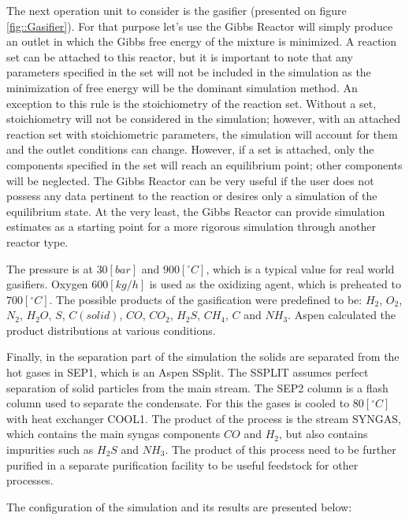 The next operation unit to consider is the gasifier (presented on figure \ref{fig::Gasifier}). For that purpose let's use the Gibbs Reactor will simply produce an outlet in which the Gibbs free energy of the mixture is minimized. A reaction set can be attached to this reactor, but it is important to note that any parameters specified in the set will not be included in the simulation as the minimization of free energy will be the dominant simulation method. An exception to this rule is the stoichiometry of the reaction set. Without a set, stoichiometry will not be considered in the simulation; however, with an attached reaction set with stoichiometric parameters, the simulation will account for them and the outlet conditions can change. However, if a set is attached, only the components specified in the set will reach an equilibrium point; other components will be neglected. The Gibbs Reactor can be very useful if the user does not possess any data pertinent to the reaction or desires only a simulation of the equilibrium state. At the very least, the Gibbs Reactor can provide simulation estimates as a starting point for a more rigorous simulation through another reactor type.

The pressure is at $30 [bar]$ and $900 [^\circ C]$, which is a typical value for real world gasifiers. Oxygen $600 [kg/h]$ is used as the oxidizing agent, which is preheated to $700 [^\circ C]$. The possible products of the gasification were predefined to be: $H_2$, $O_2$, $N_2$, $H_2O$, $S$, $C(solid)$, $CO$, $CO_2$, $H_2S$, $CH_4$, $C$ and $NH_3$. Aspen calculated the product distributions at various conditions.

Finally, in the separation part of the simulation the solids are separated from the hot gases in SEP1, which is an Aspen SSplit. The SSPLIT assumes perfect separation of solid particles from the main stream. The SEP2 column is a flash column used to separate the condensate. For this the gases is cooled to $80 [^\circ C]$ with heat exchanger COOL1. The product of the process is the stream SYNGAS, which contains the main syngas components $CO$ and $H_2$, but also contains impurities such as $H_2S$ and $NH_3$. The product of this process need to be further purified in a separate purification facility to be useful feedstock for other processes.

The configuration of the simulation and its results are presented below:

